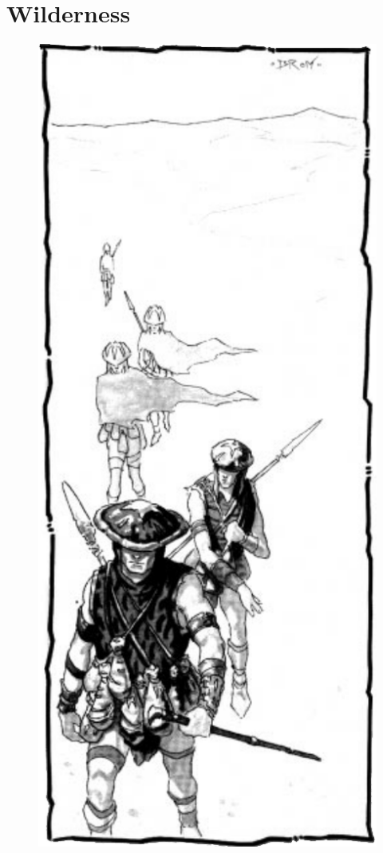 \section{Wilderness}

\begin{figure}[t!]
\centering
\includegraphics[width=\columnwidth]{images/exploring-1.png}
\WOTC
\end{figure}




